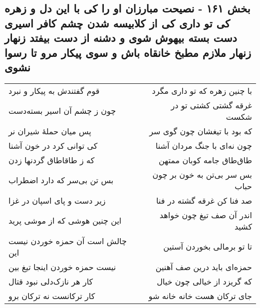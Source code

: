 \begin{center}
\section*{بخش ۱۶۱ - نصیحت مبارزان او را کی با این دل و زهره کی تو داری کی از کلابیسه شدن چشم کافر اسیری دست بسته بیهوش شوی و دشنه از دست بیفتد زنهار زنهار ملازم مطبخ خانقاه باش و سوی پیکار مرو تا رسوا نشوی}
\label{sec:sh161}
\begin{longtable}{l p{0.5cm} r}
قوم گفتندش به پیکار و نبرد
&&
با چنین زهره که تو داری مگرد
\\
چون ز چشم آن اسیر بسته‌دست
&&
غرقه گشتی کشتی تو در شکست
\\
پس میان حملهٔ شیران نر
&&
که بود با تیغشان چون گوی سر
\\
کی توانی کرد در خون آشنا
&&
چون نه‌ای با جنگ مردان آشنا
\\
که ز طاقاطاق گردنها زدن
&&
طاق‌طاق جامه کوبان ممتهن
\\
بس تن بی‌سر که دارد اضطراب
&&
بس سر بی‌تن به خون بر چون حباب
\\
زیر دست و پای اسپان در غزا
&&
صد فنا کن غرقه گشته در فنا
\\
این چنین هوشی که از موشی پرید
&&
اندر آن صف تیغ چون خواهد کشید
\\
چالش است آن حمزه خوردن نیست این
&&
تا تو برمالی بخوردن آستین
\\
نیست حمزه خوردن اینجا تیغ بین
&&
حمزه‌ای باید درین صف آهنین
\\
کار هر نازک‌دلی نبود قتال
&&
که گریزد از خیالی چون خیال
\\
کار ترکانست نه ترکان برو
&&
جای ترکان هست خانه خانه شو
\\
\end{longtable}
\end{center}
